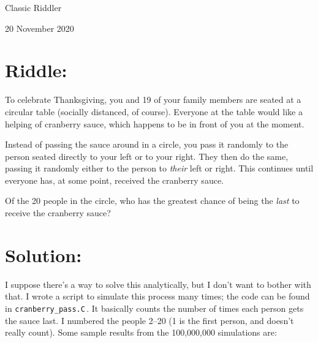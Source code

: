 \documentclass{article}
\begin{document}
\pagestyle{empty} %

\begin{center}
{\LARGE Classic Riddler}

\vspace{0.15in}

{\Large 20 November 2020}
\end{center}


\section*{Riddle:}

To celebrate Thanksgiving, you and 19 of your family members are seated at a circular table (socially distanced, of course).
Everyone at the table would like a helping of cranberry sauce, which happens to be in front of you at the moment.

Instead of passing the sauce around in a circle, you pass it randomly to the person seated directly to your left or to your right.
They then do the same, passing it randomly either to the person to \textit{their} left or right.
This continues until everyone has, at some point, received the cranberry sauce.

Of the 20 people in the circle, who has the greatest chance of being the \textit{last} to receive the cranberry sauce?


\section*{Solution:}

I suppose there's a way to solve this analytically, but I don't want to bother with that.
I wrote a script to simulate this process many times; the code can be found in \texttt{cranberry\_pass.C}\,.
It basically counts the number of times each person gets the sauce last.
I numbered the people 2--20 (1 is the first person, and doesn't really count).
Some sample results from the 100,000,000 simulations are:
\end{document}
